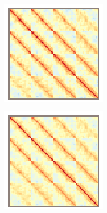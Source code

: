 	\begin{figure}
    \begin{subfigure}{\textwidth/4}
		  \includegraphics[width=\linewidth]{figures/stbf_struct/covs-0.eps}
      \caption{}
    \end{subfigure}\hfill%
    \begin{subfigure}{\textwidth/4}
		  \includegraphics[width=\linewidth]{figures/stbf_struct/covs-1.eps}

\end{subfigure}
\end{figure}
